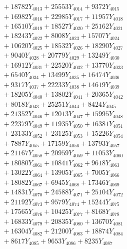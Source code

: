 \documentclass[a4paper,10pt]{article}
\begin{document}
{\begin{align}
&\;  + 18782 Y_{4013} + 25553 Y_{4014} + 9372 Y_{4015} \\[0.3ex]
&\;  + 16982 Y_{4016} + 22985 Y_{4017} + 11957 Y_{4018} \\[0.5ex]\allowbreak
&\;  + 16510 Y_{4019} + 18527 Y_{4020} + 25162 Y_{4021} \\[0.3ex]
&\;  + 18243 Y_{4022} + 8008 Y_{4023} + 15707 Y_{4024} \\[0.3ex]
&\;  + 10620 Y_{4025} + 18532 Y_{4026} + 18290 Y_{4027} \\[0.3ex]
&\;  + 9040 Y_{4028} + 20779 Y_{4029} + 13249 Y_{4030} \\[0.3ex]
&\;  + 16912 Y_{4031} + 22520 Y_{4032} + 13770 Y_{4033} \\[0.3ex]
&\;  + 6540 Y_{4034} + 13499 Y_{4035} + 16474 Y_{4036} \\[0.3ex]
&\;  + 9317 Y_{4037} + 22233 Y_{4038} + 14619 Y_{4039} \\[0.3ex]
&\;  + 18205 Y_{4040} + 13802 Y_{4041} + 20365 Y_{4042} \\[0.3ex]
&\;  + 8018 Y_{4043} + 25251 Y_{4044} + 8424 Y_{4045} \\[0.3ex]
&\;  + 21352 Y_{4046} + 12013 Y_{4047} + 15995 Y_{4048} \\[0.5ex]\allowbreak
&\;  + 22379 Y_{4049} + 11935 Y_{4050} + 16381 Y_{4051} \\[0.3ex]
&\;  + 23133 Y_{4052} + 23125 Y_{4053} + 15226 Y_{4054} \\[0.3ex]
&\;  + 7887 Y_{4055} + 17159 Y_{4056} + 13793 Y_{4057} \\[0.3ex]
&\;  + 21167 Y_{4058} + 20959 Y_{4059} + 11053 Y_{4060} \\[0.3ex]
&\;  + 18080 Y_{4061} + 10841 Y_{4062} + 9618 Y_{4063} \\[0.3ex]
&\;  + 13022 Y_{4064} + 13905 Y_{4065} + 7005 Y_{4066} \\[0.3ex]
&\;  + 18082 Y_{4067} + 6945 Y_{4068} + 17346 Y_{4069} \\[0.3ex]
&\;  + 14831 Y_{4070} + 24588 Y_{4071} + 25104 Y_{4072} \\[0.3ex]
&\;  + 21192 Y_{4073} + 9579 Y_{4074} + 15244 Y_{4075} \\[0.3ex]
&\;  + 17565 Y_{4076} + 10425 Y_{4077} + 8168 Y_{4078} \\[0.5ex]\allowbreak
&\;  + 16833 Y_{4079} + 20835 Y_{4080} + 13670 Y_{4081} \\[0.3ex]
&\;  + 16304 Y_{4082} + 21200 Y_{4083} + 18874 Y_{4084} \\[0.3ex]
&\;  + 8617 Y_{4085} + 9653 Y_{4086} + 8235 Y_{4087} \\[0.3ex]

\end{align}}
\end{document}
